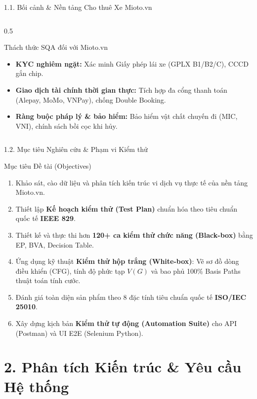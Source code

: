 \documentclass[aspectratio=169,10pt]{beamer}
\begin{document}
\begin{frame}{1.1. Bối cảnh \& Nền tảng Cho thuê Xe Mioto.vn}
\begin{columns}
\begin{column}{0.5\textwidth}
\begin{alertblock}{Thách thức SQA đối với Mioto.vn}
\begin{itemize}
          \item \textbf{KYC nghiêm ngặt:} Xác minh Giấy phép lái xe (GPLX B1/B2/C), CCCD gắn chip.
          \item \textbf{Giao dịch tài chính thời gian thực:} Tích hợp đa cổng thanh toán (Alepay, MoMo, VNPay), chống Double Booking.
          \item \textbf{Ràng buộc pháp lý \& bảo hiểm:} Bảo hiểm vật chất chuyến đi (MIC, VNI), chính sách bồi cọc khi hủy.
        \end{itemize}
      \end{alertblock}
    \end{column}
  \end{columns}
\end{frame}

\begin{frame}{1.2. Mục tiêu Nghiên cứu \& Phạm vi Kiểm thử}
  \begin{block}{Mục tiêu Đề tài (Objectives)}
    \begin{enumerate}
      \item Khảo sát, cào dữ liệu và phân tích kiến trúc vi dịch vụ thực tế của nền tảng Mioto.vn.
      \item Thiết lập \textbf{Kế hoạch kiểm thử (Test Plan)} chuẩn hóa theo tiêu chuẩn quốc tế \textbf{IEEE 829}.
      \item Thiết kế và thực thi hơn \textbf{120+ ca kiểm thử chức năng (Black-box)} bằng EP, BVA, Decision Table.
      \item Ứng dụng kỹ thuật \textbf{Kiểm thử hộp trắng (White-box)}: Vẽ sơ đồ dòng điều khiển (CFG), tính độ phức tạp $V(G)$ và bao phủ 100\% Basis Paths thuật toán tính cước.
      \item Đánh giá toàn diện sản phẩm theo 8 đặc tính tiêu chuẩn quốc tế \textbf{ISO/IEC 25010}.
      \item Xây dựng kịch bản \textbf{Kiểm thử tự động (Automation Suite)} cho API (Postman) và UI E2E (Selenium Python).
    \end{enumerate}
  \end{block}
\end{frame}

\section{2. Phân tích Kiến trúc \& Yêu cầu Hệ thống}
\end{document}
